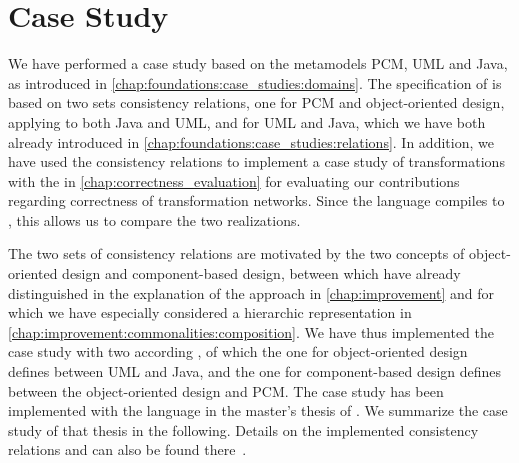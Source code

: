 \section{Case Study}

We have performed a case study based on the metamodels \gls{PCM}, \gls{UML} and Java, as introduced in \autoref{chap:foundations:case_studies:domains}.
The specification of \commonalities is based on two sets consistency relations, one for \gls{PCM} and object-oriented design, applying to both Java and \gls{UML}, and for \gls{UML} and Java, which we have both already introduced in \autoref{chap:foundations:case_studies:relations}.
In addition, we have used the consistency relations to implement a case study of transformations with the \reactionslanguage in \autoref{chap:correctness_evaluation} for evaluating our contributions regarding correctness of transformation networks.
Since the \commonalities language compiles to \reactions, this allows us to compare the two realizations.

The two sets of consistency relations are motivated by the two concepts of object-oriented design and component-based design, between which have already distinguished in the explanation of the \commonalities approach in \autoref{chap:improvement} and for which we have especially considered a hierarchic representation in \autoref{chap:improvement:commonalities:composition}.
We have thus implemented the case study with two according \conceptmetamodels, of which the one for object-oriented design defines \commonalities between \gls{UML} and Java, and the one for component-based design defines \commonalities between the object-oriented design \conceptmetamodel and \gls{PCM}.
The case study has been implemented with the \commonalities language in the master's thesis of \textcite{hennig2020ma}.
We summarize the case study of that thesis in the following.
Details on the implemented consistency relations and \commonalities can also be found there~.

